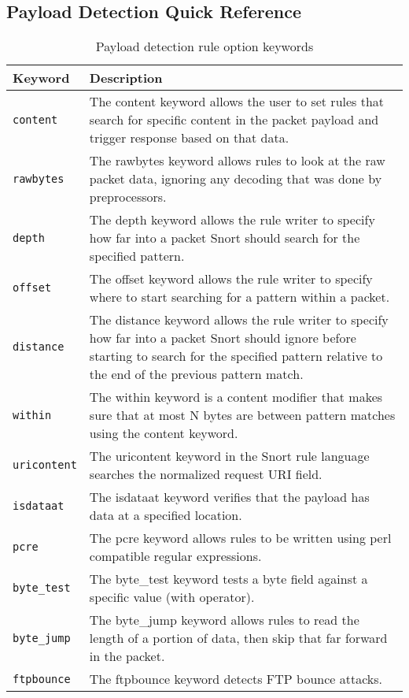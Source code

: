\documentclass[english]{report}
\begin{document}
\subsection{Payload Detection Quick Reference}
\begin{center}
\begin{longtable}{| p{1in} | p{5in} |}
\caption{Payload detection rule option keywords} \\
\hline
Keyword & Description \\
\hline
\texttt{content} & The content keyword allows the user to set rules that search for
specific content in the packet payload and trigger response based on that data. \\
\hline
\texttt{rawbytes} & The rawbytes keyword allows rules to look at the raw packet data,
ignoring any decoding that was done by preprocessors. \\
\hline
\texttt{depth} & The depth keyword allows the rule writer to specify how far into a
packet Snort should search for the specified pattern. \\
\hline
\texttt{offset} & The offset keyword allows the rule writer to specify where to start
searching for a pattern within a packet. \\
\hline
\texttt{distance} & The distance keyword allows the rule writer to specify how far
into a packet Snort should ignore before starting to search for the specified
pattern relative to the end of the previous pattern match. \\
\hline
\texttt{within} & The within keyword is a content modifier that makes sure that at
most N bytes are between pattern matches using the content keyword. \\
\hline
\texttt{uricontent} & The uricontent keyword in the Snort rule language searches the
normalized request URI field. \\
\hline
\texttt{isdataat} & The isdataat keyword verifies that the payload has data at a
specified location. \\
\hline
\texttt{pcre} & The pcre keyword allows rules to be written using perl compatible
regular expressions. \\
\hline
\texttt{byte\_test} & The byte\_test keyword tests a byte field against a specific
value (with operator). \\
\hline
\texttt{byte\_jump} & The byte\_jump keyword allows rules to read the length of a
portion of data, then skip that far forward in the packet. \\
\hline
\texttt{ftpbounce} & The ftpbounce keyword detects FTP bounce attacks. \\
\hline
\end{longtable}
\end{center}
\end{document}
